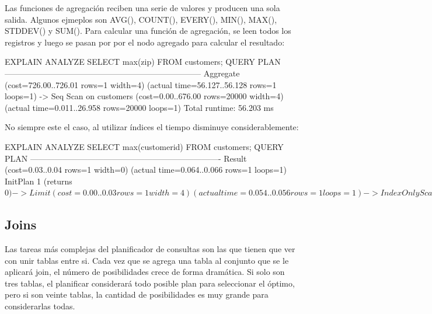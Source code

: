 Las funciones de agregación reciben una serie de valores y producen una sola salida. Algunos ejmeplos son AVG(), COUNT(), EVERY(), MIN(), MAX(), STDDEV() y SUM(). Para calcular una función de agregación, se leen todos los registros y luego se pasan por por el nodo agregado para calcular el resultado:\\

\begin{pyglist}
EXPLAIN ANALYZE SELECT max(zip) FROM customers;
                                   QUERY PLAN                                                     
------------------------------------------------------------------------
 Aggregate  (cost=726.00..726.01 rows=1 width=4) 
 (actual time=56.127..56.128 rows=1 loops=1)
   ->  Seq Scan on customers  (cost=0.00..676.00 rows=20000 width=4) 
                       (actual time=0.011..26.958 rows=20000 loops=1)
 Total runtime: 56.203 ms
\end{pyglist}

No siempre este el caso, al utilizar índices el tiempo disminuye considerablemente:\\

\begin{pyglist}
EXPLAIN ANALYZE SELECT max(customerid) FROM customers;
   QUERY PLAN                                                                         
----------------------------------------------------------------------
 Result  (cost=0.03..0.04 rows=1 width=0)
       (actual time=0.064..0.066 rows=1 loops=1)
   InitPlan 1 (returns $0)
     ->  Limit  (cost=0.00..0.03 rows=1 width=4) 
          (actual time=0.054..0.056 rows=1 loops=1)
           ->  Index Only Scan Backward using customers_pkey on customers 
               (cost=0.00..534.25 rows=20000 width=4) 
               (actual time=0.049..0.049 rows=1 loops=1)
                 Index Cond: (customerid IS NOT NULL)
                 Heap Fetches: 0
 Total runtime: 0.120 ms $
\end{pyglist}

\subsection{Joins}

Las tareas más complejas del planificador de consultas son las que tienen que ver con unir tablas entre si. Cada vez que se agrega una tabla al conjunto que se le aplicará join, el número de posibilidades crece de forma dramática. Si solo son tres tablas, el planificar considerará todo posible plan para seleccionar el óptimo, pero si son veinte tablas, la cantidad de posibilidades es muy grande para considerarlas todas. \cite{GregorySmith2010}\\

